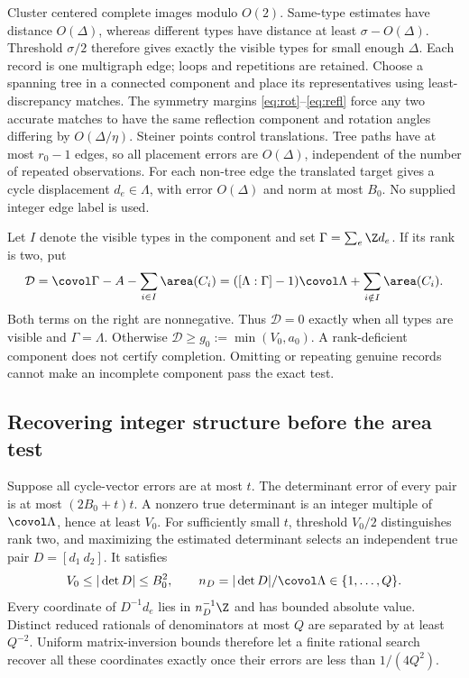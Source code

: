 Cluster centered complete images modulo $O(2)$. Same-type estimates have
distance $O(\Delta)$, whereas different types have distance at least
$\sigma-O(\Delta)$. Threshold $\sigma/2$ therefore gives exactly the
visible types for small enough $\Delta$. Each record is one multigraph
edge; loops and repetitions are retained. Choose a spanning tree in a
connected component and place its representatives using least-discrepancy
matches. The symmetry margins \eqref{eq:rot}--\eqref{eq:refl} force any
two accurate matches to have the same reflection component and rotation
angles differing by $O(\Delta/\eta)$. Steiner points control translations.
Tree paths have at most $r_0-1$ edges, so all placement errors are
$O(\Delta)$, independent of the number of repeated observations.
For each non-tree edge the translated target gives a cycle displacement
$d_e\in\Lambda$, with error $O(\Delta)$ and norm at most $B_0$.
No supplied integer edge label is used.

Let $I$ denote the visible types in the component and set
$\Gamma=\sum_e\Z d_e$. If its rank is two, put
\begin{equation}\label{eq:defect}
 \mathcal D=\covol\Gamma-A-\sum_{i\in I}\area(C_i)
 =([\Lambda:\Gamma]-1)\covol\Lambda
                         +\sum_{i\notin I}\area(C_i).
\end{equation}
Both terms on the right are nonnegative. Thus $\mathcal D=0$ exactly
when all types are visible and $\Gamma=\Lambda$. Otherwise
$\mathcal D\ge g_0:=\min(V_0,a_0)$. A rank-deficient component does
not certify completion. Omitting or repeating genuine records cannot
make an incomplete component pass the exact test.

\subsection{Recovering integer structure before the area test}
Suppose all cycle-vector errors are at most $t$. The determinant error
of every pair is at most $(2B_0+t)t$. A nonzero true determinant is
an integer multiple of $\covol\Lambda$, hence at least $V_0$.
For sufficiently small $t$, threshold $V_0/2$ distinguishes rank two,
and maximizing the estimated determinant selects an independent true
pair $D=[d_1\ d_2]$. It satisfies
\[
 V_0\le|\det D|\le B_0^2,\qquad
 n_D=|\det D|/\covol\Lambda\in\{1,\ldots,Q\}.
\]
Every coordinate of $D^{-1}d_e$ lies in $n_D^{-1}\Z$ and has bounded
absolute value. Distinct reduced rationals of denominators at most $Q$
are separated by at least $Q^{-2}$. Uniform matrix-inversion bounds
therefore let a finite rational search recover all these coordinates
exactly once their errors are less than $1/(4Q^2)$.

